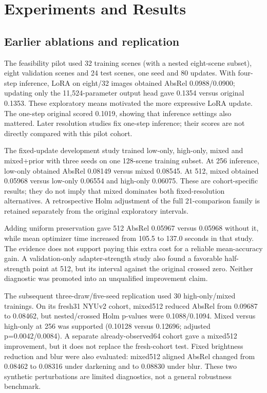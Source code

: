 \documentclass[10pt,twocolumn,letterpaper]{article}
\begin{document}
\section{Experiments and Results}
\subsection{Earlier ablations and replication}
The feasibility pilot used 32 training scenes (with a nested eight-scene subset), eight validation scenes and 24 test scenes, one seed and 80 updates. With four-step inference, LoRA on eight/32 images obtained AbsRel 0.0988/0.0900; updating only the 11,524-parameter output head gave 0.1354 versus original 0.1353. These exploratory means motivated the more expressive LoRA update. The one-step original scored 0.1019, showing that inference settings also mattered. Later resolution studies fix one-step inference; their scores are not directly compared with this pilot cohort.

The fixed-update development study trained low-only, high-only, mixed and mixed+prior with three seeds on one 128-scene training subset. At 256 inference, low-only obtained AbsRel 0.08149 versus mixed 0.08545. At 512, mixed obtained 0.05968 versus low-only 0.06554 and high-only 0.06075. These are cohort-specific results; they do not imply that mixed dominates both fixed-resolution alternatives. A retrospective Holm adjustment of the full 21-comparison family is retained separately from the original exploratory intervals.

Adding uniform preservation gave 512 AbsRel 0.05967 versus 0.05968 without it, while mean optimizer time increased from 105.5 to 137.0 seconds in that study. The evidence does not support paying this extra cost for a reliable mean-accuracy gain. A validation-only adapter-strength study also found a favorable half-strength point at 512, but its interval against the original crossed zero. Neither diagnostic was promoted into an unqualified improvement claim.

The subsequent three-draw/five-seed replication used 30 high-only/mixed trainings. On its fresh31 NYUv2 cohort, mixed512 reduced AbsRel from 0.09687 to 0.08462, but nested/crossed Holm p-values were 0.1088/0.1094. Mixed versus high-only at 256 was supported (0.10128 versus 0.12696; adjusted p=0.0042/0.0084). A separate already-observed64 cohort gave a mixed512 improvement, but it does not replace the fresh-cohort test. Fixed brightness reduction and blur were also evaluated: mixed512 aligned AbsRel changed from 0.08462 to 0.08316 under darkening and to 0.08830 under blur. These two synthetic perturbations are limited diagnostics, not a general robustness benchmark.
\end{document}
